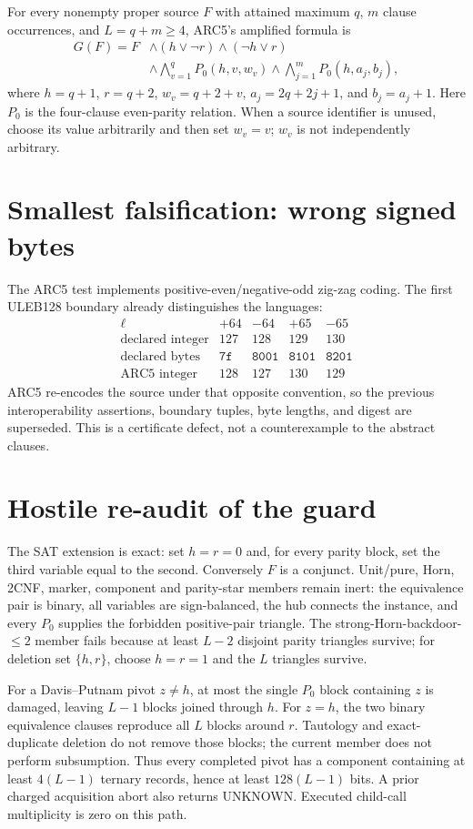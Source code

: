 \documentclass[11pt]{article}
\begin{document}
For every nonempty proper source $F$ with attained maximum $q$, $m$ clause
occurrences, and $L=q+m\ge4$, ARC5's amplified formula is
\[
\begin{split}
G(F)=F&\wedge(h\vee\neg r)\wedge(\neg h\vee r)\\
 &\wedge\bigwedge_{v=1}^{q}P_0(h,v,w_v)
 \wedge\bigwedge_{j=1}^{m}P_0(h,a_j,b_j),
\end{split}
\]
where $h=q+1$, $r=q+2$, $w_v=q+2+v$,
$a_j=2q+2j+1$, and $b_j=a_j+1$.  Here $P_0$ is the four-clause
even-parity relation.  When a source identifier is unused, choose its value
arbitrarily and then set $w_v=v$; $w_v$ is not independently arbitrary.

\section{Smallest falsification: wrong signed bytes}
The ARC5 test implements positive-even/negative-odd zig-zag coding.  The
first ULEB128 boundary already distinguishes the languages:
\[
\begin{array}{c|cccc}
 \ell&+64&-64&+65&-65\\\hline
 \text{declared integer}&127&128&129&130\\
 \text{declared bytes}&\mathtt{7f}&\mathtt{8001}&\mathtt{8101}&\mathtt{8201}\\
 \text{ARC5 integer}&128&127&130&129
\end{array}
\]
ARC5 re-encodes the source under that opposite convention, so the previous
interoperability assertions, boundary tuples, byte lengths, and digest are
superseded.  This is a certificate defect, not a counterexample to the
abstract clauses.

\section{Hostile re-audit of the guard}
The SAT extension is exact: set $h=r=0$ and, for every parity block, set the
third variable equal to the second.  Conversely $F$ is a conjunct.
Unit/pure, Horn, 2CNF, marker, component and parity-star members remain inert:
the equivalence pair is binary, all variables are sign-balanced, the hub
connects the instance, and every $P_0$ supplies the forbidden positive-pair
triangle.  The strong-Horn-backdoor-$\le2$ member fails because at least
$L-2$ disjoint parity triangles survive; for deletion set $\{h,r\}$, choose
$h=r=1$ and the $L$ triangles survive.

For a Davis--Putnam pivot $z\ne h$, at most the single $P_0$ block containing
$z$ is damaged, leaving $L-1$ blocks joined through $h$.  For $z=h$, the two
binary equivalence clauses reproduce all $L$ blocks around $r$.  Tautology
and exact-duplicate deletion do not remove those blocks; the current member
does not perform subsumption.  Thus every completed pivot has a component
containing at least $4(L-1)$ ternary records, hence at least $128(L-1)$ bits.
A prior charged acquisition abort also returns UNKNOWN.  Executed child-call
multiplicity is zero on this path.
\end{document}
